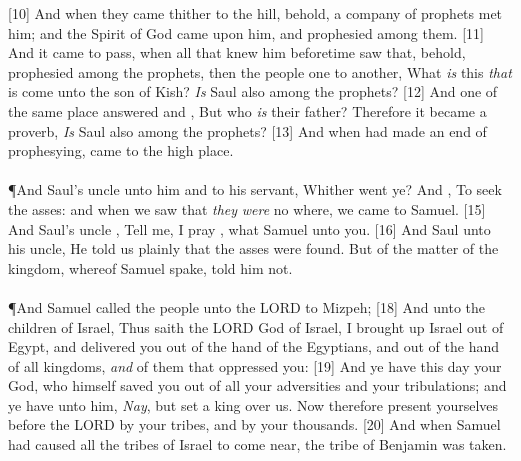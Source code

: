 [10] \textcolor[cmyk]{0.99998,1,0,0}{And when they came thither to the hill, behold, a company of prophets met him; and the Spirit of God came upon him, and  prophesied among them.}
[11] \textcolor[cmyk]{0.99998,1,0,0}{And it came to pass, when all that knew him beforetime saw that, behold,  prophesied among the prophets, then the people  one to another, What \emph{is} this \emph{that} is come unto the son of Kish? \emph{Is} Saul also among the prophets?}
[12] \textcolor[cmyk]{0.99998,1,0,0}{And one of the same place answered and , But who \emph{is} their father? Therefore it became a proverb, \emph{Is} Saul also among the prophets?}
[13] \textcolor[cmyk]{0.99998,1,0,0}{And when  had made an end of prophesying,  came to the high place.}\\
\\
\P \textcolor[cmyk]{0.99998,1,0,0}{And Saul's uncle  unto him and to his servant, Whither went ye? And  , To seek the asses: and when we saw that \emph{they} \emph{were} no where, we came to Samuel.}
[15] \textcolor[cmyk]{0.99998,1,0,0}{And Saul's uncle , Tell me, I pray , what Samuel  unto you.}
[16] \textcolor[cmyk]{0.99998,1,0,0}{And Saul  unto his uncle, He told us plainly that the asses were found. But of the matter of the kingdom, whereof Samuel spake,  told him not.}\\
\\
\P \textcolor[cmyk]{0.99998,1,0,0}{And Samuel called the people  unto the LORD to Mizpeh;}
[18] \textcolor[cmyk]{0.99998,1,0,0}{And  unto the children of Israel, Thus saith the LORD God of Israel, I brought up Israel out of Egypt, and delivered you out of the hand of the Egyptians, and out of the hand of all kingdoms, \emph{and} of them that oppressed you:}
[19] \textcolor[cmyk]{0.99998,1,0,0}{And ye have this day  your God, who himself saved you out of all your adversities and your tribulations; and ye have  unto him, \emph{Nay}, but set a king over us. Now therefore present yourselves before the LORD by your tribes, and by your thousands.}
[20] \textcolor[cmyk]{0.99998,1,0,0}{And when Samuel had caused all the tribes of Israel to come near, the tribe of Benjamin was taken.}

